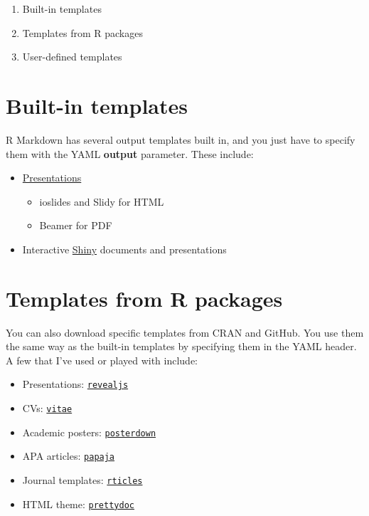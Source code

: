 \documentclass[
]{book}
\providecommand{\tightlist}{%
  \setlength{\itemsep}{0pt}\setlength{\parskip}{0pt}}
\begin{document}
\begin{enumerate}
\def\labelenumi{\arabic{enumi}.}
\tightlist
\item
  Built-in templates
\item
  Templates from R packages
\item
  User-defined templates
\end{enumerate}

\hypertarget{built-in-templates}{%
\section{Built-in templates}\label{built-in-templates}}

R Markdown has several output templates built in, and you just have to specify them with the YAML \textbf{output} parameter. These include:

\begin{itemize}
\tightlist
\item
  \href{https://rmarkdown.rstudio.com/lesson-11.html}{Presentations}

  \begin{itemize}
  \tightlist
  \item
    ioslides and Slidy for HTML
  \item
    Beamer for PDF
  \end{itemize}
\item
  Interactive \href{https://bookdown.org/yihui/rmarkdown/shiny-documents.html}{Shiny} documents and presentations
\end{itemize}

\hypertarget{packages}{%
\section{Templates from R packages}\label{packages}}

You can also download specific templates from CRAN and GitHub. You use them the same way as the built-in templates by specifying them in the YAML header. A few that I've used or played with include:

\begin{itemize}
\tightlist
\item
  Presentations: \href{https://cran.r-project.org/web/packages/revealjs/index.html}{\texttt{revealjs}}
\item
  CVs: \href{https://github.com/mitchelloharawild/vitae}{\texttt{vitae}}
\item
  Academic posters: \href{https://github.com/brentthorne/posterdown}{\texttt{posterdown}}
\item
  APA articles: \href{https://github.com/crsh/papaja}{\texttt{papaja}}
\item
  Journal templates: \href{https://bookdown.org/yihui/rmarkdown/rticles-templates.html}{\texttt{rticles}}
\item
  HTML theme: \href{https://github.com/yixuan/prettydoc}{\texttt{prettydoc}}
\end{itemize}
\end{document}
